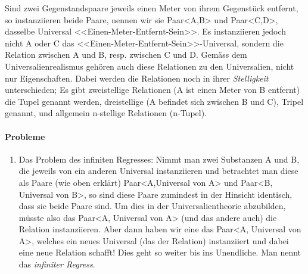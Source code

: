 \documentclass[../main.tex]{subfiles}
\begin{document}
Sind zwei Gegenstandspaare jeweils einen Meter von ihrem Gegenstück entfernt, so instanziieren beide Paare, nennen wir sie Paar<A,B> und Paar<C,D>, dasselbe Universal <<Einen-Meter-Entfernt-Sein>>. Es instanziieren jedoch nicht A oder C das <<Einen-Meter-Entfernt-Sein>>-Universal, sondern die Relation zwischen A und B, resp. zwischen C und D. Gemäss dem Universalienrealismus gehören auch diese Relationen zu den Universalien, nicht nur Eigenschaften. Dabei werden die Relationen noch in ihrer \textit{Stelligkeit} unterschieden; Es gibt zweistellige Relationen (A ist einen Meter von B entfernt) die Tupel genannt werden, dreistellige (A befindet sich zwischen B und C), Tripel genannt, und allgemein n-stellige Relationen (n-Tupel).

\paragraph{Probleme} 
\begin{enumerate}
	\item Das Problem des infiniten Regresses: Nimmt man zwei Substanzen A und B, die jeweils von ein anderen Universal instanziieren und betrachtet man diese als Paare (wie oben erklärt) Paar<A,Universal von A> und Paar<B, Universal von B>, so sind diese Paare zumindest in der Hinsicht identisch, dass sie beide Paare sind. Um dies in der Universalientheorie abzubilden, müsste also das Paar<A, Universal von A> (und das andere auch) die Relation instanziieren. Aber dann haben wir eine das Paar<A, Universal von A>, welches ein neues Universal (das der Relation) instanziiert und dabei eine neue Relation schafft! Dies geht so weiter bis ins Unendliche. Man nennt das \textit{infiniter Regress}.
		\begin{minipage}[t]{\linewidth}
          \raggedright
    	\end{minipage}
\end{enumerate}
\end{document}
